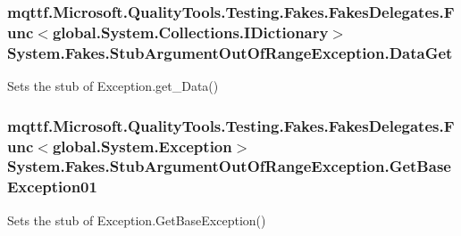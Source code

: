 \hypertarget{class_system_1_1_fakes_1_1_stub_argument_out_of_range_exception_a84982b1ab980eeba9345140b37438209}{
\subsubsection[{Data\-Get}]{\setlength{\rightskip}{0pt plus 5cm}mqttf.\-Microsoft.\-Quality\-Tools.\-Testing.\-Fakes.\-Fakes\-Delegates.\-Func$<$global.\-System.\-Collections.\-I\-Dictionary$>$ System.\-Fakes.\-Stub\-Argument\-Out\-Of\-Range\-Exception.\-Data\-Get}}\label{class_system_1_1_fakes_1_1_stub_argument_out_of_range_exception_a84982b1ab980eeba9345140b37438209}


Sets the stub of Exception.\-get\-\_\-\-Data()

\hypertarget{class_system_1_1_fakes_1_1_stub_argument_out_of_range_exception_a43d17b1e584cf66d37d591f5a75a8bd6}{
\subsubsection[{Get\-Base\-Exception01}]{\setlength{\rightskip}{0pt plus 5cm}mqttf.\-Microsoft.\-Quality\-Tools.\-Testing.\-Fakes.\-Fakes\-Delegates.\-Func$<$global.\-System.\-Exception$>$ System.\-Fakes.\-Stub\-Argument\-Out\-Of\-Range\-Exception.\-Get\-Base\-Exception01}}\label{class_system_1_1_fakes_1_1_stub_argument_out_of_range_exception_a43d17b1e584cf66d37d591f5a75a8bd6}


Sets the stub of Exception.\-Get\-Base\-Exception()

